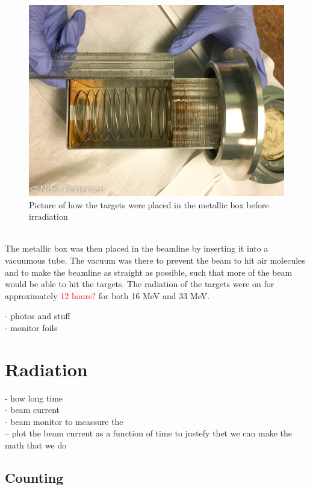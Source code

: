 \documentclass[twoside,english]{uiofysmaster/uiofysmaster}
\begin{document}
\begin{figure} [h]
   \centering
   \includegraphics[scale=.2]{target_stack-1.JPG}
   \caption{Picture of how the targets were placed in the metallic box before irradiation}
   \label{fig:target_stack}
\end{figure}
\\
\noindent
The metallic box was then placed in the beamline by inserting it into a vacuumous tube. The vacuum was there to prevent the beam to hit air molecules and to make the beamline as straight as possible, such that more of the beam would be able to hit the targets. The radiation of the targets were on for approximately \textcolor{red}{12 hours?} for both 16 MeV and 33 MeV. 
\cite{E.Lawrence}


- photos and stuff\\
- monitor foils



\section{Radiation}
\label{sec:radiation}

- how long time\\
- beam current\\
- beam monitor to meassure the  \\
-- plot the beam current  as a function of time to justefy thet we can make the math that we do


\subsection{Counting}
\label{sec:counting}
\end{document}
